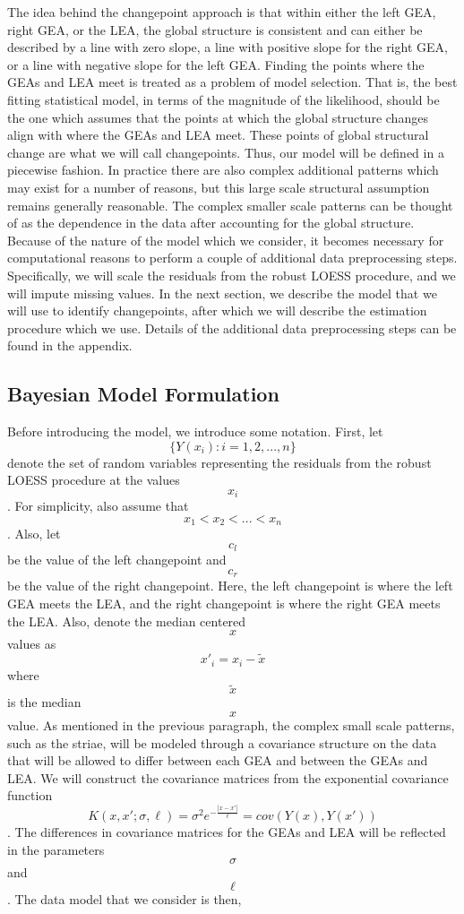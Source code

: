 \documentclass[12pt]{article}
\begin{document}
The idea behind the changepoint approach is that within either the left
GEA, right GEA, or the LEA, the global structure is consistent and can
either be described by a line with zero slope, a line with positive
slope for the right GEA, or a line with negative slope for the left GEA.
Finding the points where the GEAs and LEA meet is treated as a problem
of model selection. That is, the best fitting statistical model, in
terms of the magnitude of the likelihood, should be the one which
assumes that the points at which the global structure changes align with
where the GEAs and LEA meet. These points of global structural change
are what we will call changepoints. Thus, our model will be defined in a
piecewise fashion. In practice there are also complex additional
patterns which may exist for a number of reasons, but this large scale
structural assumption remains generally reasonable. The complex smaller
scale patterns can be thought of as the dependence in the data after
accounting for the global structure. Because of the nature of the model
which we consider, it becomes necessary for computational reasons to
perform a couple of additional data preprocessing steps. Specifically,
we will scale the residuals from the robust LOESS procedure, and we will
impute missing values. In the next section, we describe the model that
we will use to identify changepoints, after which we will describe the
estimation procedure which we use. Details of the additional data
preprocessing steps can be found in the appendix.

\subsection{Bayesian Model Formulation}

Before introducing the model, we introduce some notation. First, let
\[\{Y(x_i): i = 1,2, ..., n\}\] denote the set of random variables
representing the residuals from the robust LOESS procedure at the values
\[x_i\]. For simplicity, also assume that \[x_1 < x_2 < ... < x_n\].
Also, let \[c_l\] be the value of the left changepoint and \[c_r\] be
the value of the right changepoint. Here, the left changepoint is where
the left GEA meets the LEA, and the right changepoint is where the right
GEA meets the LEA. Also, denote the median centered \[x\] values as
\[x'_i = x_i - \tilde{x}\] where \[\tilde{x}\] is the median \[x\]
value. As mentioned in the previous paragraph, the complex small scale
patterns, such as the striae, will be modeled through a covariance
structure on the data that will be allowed to differ between each GEA
and between the GEAs and LEA. We will construct the covariance matrices
from the exponential covariance function
\[K(x, x';\sigma, \ell) = \sigma^2 e^{-\frac{|x - x'|}{\ell}} = cov(Y(x), Y(x'))\].
The differences in covariance matrices for the GEAs and LEA will be
reflected in the parameters \[\sigma\] and \[\ell\]. The data model that
we consider is then,
\end{document}
